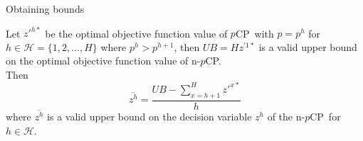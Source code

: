 \documentclass[utf8,aspectratio=169,ngerman,english]{beamer}
\newcommand{\pCP}{$p$CP\xspace}
\newcommand{\npCP}{n-$p$CP\xspace}
\begin{document}
\begin{frame}{Obtaining bounds} \pause
    \begin{lemma}\label{lemma:upperbounds}
        Let $z'^{h*}$ be the optimal objective function value of \pCP\ with $p = p^h$ for $h \in \mathcal H = \{1, 2, \dots, H\}$ where $p^h > p^{h+1}$, \pause
        then $UB = H z^{'1*}$ is a valid upper bound on the optimal objective function value of \npCP. \\ \pause
        Then
        \begin{equation*}
            \overline{z^h} = \frac{UB - \sum_{x = h+1}^{H}z'^{x*}}{h}
        \end{equation*} \pause
        where $\overline{z^h}$ is a valid upper bound on the decision variable $z^h$ of the \npCP\ for $h \in \mathcal H$.
    \end{lemma}
\end{frame}

\end{document}
